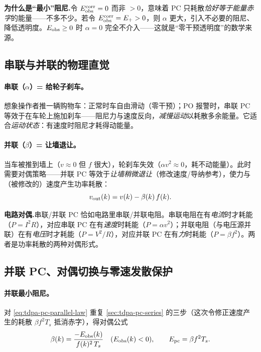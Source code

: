 \begin{insight}
\textbf{为什么是“最小”阻尼.}\;令 $E_{\rm obs}^{\rm corr}=0$ 而非 $>0$，意味着 PC 只耗散\emph{恰好等于能量赤字}的能量——不多不少。若令 $E_{\rm obs}^{\rm corr}=E_{+}>0$，则 $\alpha$ 更大，引入不必要的阻尼、降低透明度。$E_{\rm obs}\ge0$ 时 $\alpha=0$ 完全不介入——这就是“零干预透明度”的数学来源。
\end{insight}

\subsection{串联与并联的物理直觉}
\label{sec:tdpa-pc-intuition}

\paragraph{串联（$\alpha$）= 给轮子刹车。}
想象操作者推一辆购物车：正常时车自由滑动（零干预）；PO 报警时，串联 PC 等效于在车轮上施加刹车——阻尼力与速度反向，\emph{减慢运动}以耗散多余能量。它适合\emph{运动状态}：有速度时阻尼才耗得动能量。

\paragraph{并联（$\beta$）= 让墙退让。}
当车被推到墙上（$v\approx0$ 但 $f$ 很大），轮刹车失效（$\alpha v^2\approx0$，耗不动能量）。此时需要对偶策略——并联 PC 等效于\emph{让墙稍微退让}（修改速度/导纳参考），使力与（被修改的）速度产生功率耗散：
\begin{equation}
  v_{\rm out}(k)=v(k)-\beta(k)\,f(k).
  \label{eq:tdpa-pc-parallel-law}
\end{equation}

\begin{insight}
\textbf{电路对偶.}\;串联/并联 PC 恰如电路里串联/并联电阻。串联电阻在有\emph{电流}时才耗能（$P=I^2R$），对应串联 PC 在有\emph{速度}时耗能（$P=\alpha v^2$）；并联电阻（与电压源并联）在有\emph{电压}时才耗能（$P=V^2/R$），对应并联 PC 在有\emph{力}时耗能（$P=\beta f^2$）。两者是功率耗散的两种对偶形式。
\end{insight}

\subsection{并联 PC、对偶切换与零速发散保护}
\label{sec:tdpa-dual}

\paragraph{并联最小阻尼。}
对 \cref{eq:tdpa-pc-parallel-law} 重复 \cref{sec:tdpa-pc-series} 的三步（这次令修正速度产生的耗散 $\beta f^2 T_s$ 抵消赤字），得对偶公式
\begin{equation}
  \beta(k)=\dfrac{-E_{\rm obs}(k)}{f(k)^2\,T_s}\quad(E_{\rm obs}(k)<0),\qquad
  E_{\rm pc}=\beta f^2 T_s .
  \label{eq:tdpa-beta}
\end{equation}

